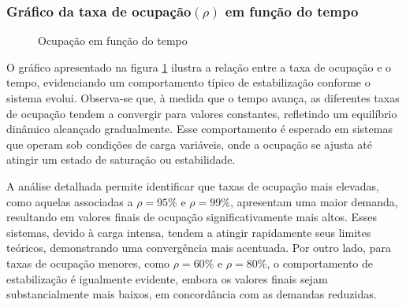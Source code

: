\subsubsection{Gráfico da taxa de ocupação$(\rho)$ em função do tempo}
\begin{figure}[h!]
   \centering
   
   \caption{Ocupação em função do tempo}
   \label{fig:ocupacaoE1}
\end{figure}

O gráfico apresentado na figura \ref{fig:ocupacaoE1} ilustra a relação entre a taxa de ocupação e o tempo, evidenciando um comportamento típico de estabilização conforme o sistema evolui. Observa-se que, à medida que o tempo avança, as diferentes taxas de ocupação tendem a convergir para valores constantes, refletindo um equilíbrio dinâmico alcançado gradualmente. Esse comportamento é esperado em sistemas que operam sob condições de carga variáveis, onde a ocupação se ajusta até atingir um estado de saturação ou estabilidade.

A análise detalhada permite identificar que taxas de ocupação mais elevadas, como aquelas associadas a $\rho = 95\%$ e $\rho = 99\%$, apresentam uma maior demanda, resultando em valores finais de ocupação significativamente mais altos. Esses sistemas, devido à carga intensa, tendem a atingir rapidamente seus limites teóricos, demonstrando uma convergência mais acentuada. Por outro lado, para taxas de ocupação menores, como $\rho = 60\%$ e $\rho = 80\%$, o comportamento de estabilização é igualmente evidente, embora os valores finais sejam substancialmente mais baixos, em concordância com as demandas reduzidas.


